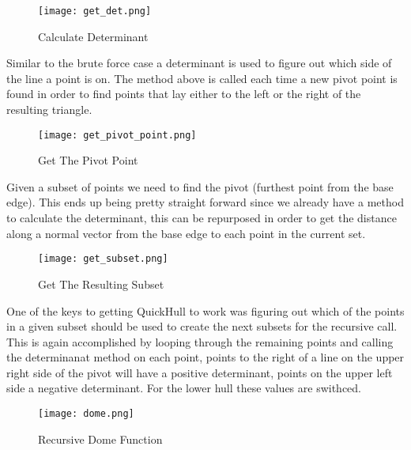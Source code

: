 \documentclass[a4paper, 12pt]{article}
\begin{document}
{  \begin{figure}[H]
  \begin{center}
    \texttt{[image: get\_det.png]}
  \end{center}
    \caption{Calculate Determinant}
    \label{fig:get_det}
  \end{figure} 

  Similar to the brute force case a determinant is used to figure out which side of the line a point is on.  The method above is called each time a new pivot point is found in order to find points that lay either to the left or the right of the resulting triangle.
  
  \begin{figure}[H]
  \begin{center}
    \texttt{[image: get\_pivot\_point.png]}
  \end{center}
    \caption{Get The Pivot Point}
    \label{fig:get_pivot}
  \end{figure}
  Given a subset of points we need to find the pivot (furthest point from the base edge). This ends up being pretty straight forward since we already have a method to calculate the determinant, this can be repurposed in order to get the distance along a normal vector from the base edge to each point in the current set.  


  \begin{figure}[H]
  \begin{center}
    \texttt{[image: get\_subset.png]}
  \end{center}
    \caption{Get The Resulting Subset}
    \label{fig:get_subset}
  \end{figure}
One of the keys to getting QuickHull to work was figuring out which of the points in a given subset should be used to create the next subsets for the recursive call.  This is again accomplished by looping through the remaining points and calling the determinanat method on each point, points to the right of a line on the upper right side of the pivot will have a positive determinant, points on the upper left side a negative determinant.  For the lower hull these values are swithced.

  \begin{figure}[H]
  \begin{center}
    \texttt{[image: dome.png]}
  \end{center}
    \caption{Recursive Dome Function}
    \label{fig:dome}
  \end{figure}

}
\end{document}
